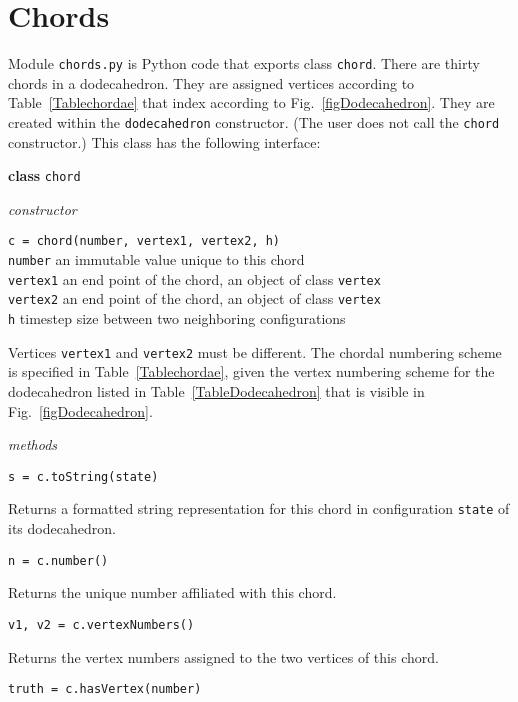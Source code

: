 \section{Chords}
\label{appchords}

Module \texttt{chords.py} is Python code that exports class \texttt{chord}.  There are thirty chords in a dodecahedron.  They are assigned vertices according to Table~\ref{Tablechordae} that index according to Fig.~\ref{figDodecahedron}.  They are created within the \texttt{dodecahedron} constructor.  (The user does not call the \texttt{chord} constructor.)  This class has the following interface:

\bigskip\noindent
\textbf{class} \texttt{chord}

\medskip\noindent
\textit{constructor}

\medskip\noindent
\texttt{c = chord(number, vertex1, vertex2, h)} \\
\indent \texttt{number\phantom{1}} \; an immutable value unique to this chord \\
\indent \texttt{vertex1} \; an end point of the chord, an object of class \texttt{vertex} \\
\indent \texttt{vertex2} \; an end point of the chord, an object of class \texttt{vertex} \\
\indent \texttt{h} \qquad\quad\;\; timestep size between two neighboring configurations

\medskip\noindent
Vertices \texttt{vertex1} and \texttt{vertex2} must be different.  The chordal numbering scheme is specified in Table~\ref{Tablechordae}, given the vertex numbering scheme for the dodecahedron listed in Table~\ref{TableDodecahedron} that is visible in Fig.~\ref{figDodecahedron}.

\medskip\noindent
\textit{methods}

\medskip\noindent
\texttt{s = c.toString(state)}

\medskip\noindent
Returns a formatted string representation for this chord in configuration \texttt{state} of its dodecahedron.

\medskip\noindent
\texttt{n = c.number()}

\medskip\noindent
Returns the unique number affiliated with this chord.

\medskip\noindent
\texttt{v1, v2 = c.vertexNumbers()}

\medskip\noindent
Returns the vertex numbers assigned to the two vertices of this chord.

\medskip\noindent
\texttt{truth = c.hasVertex(number)}

